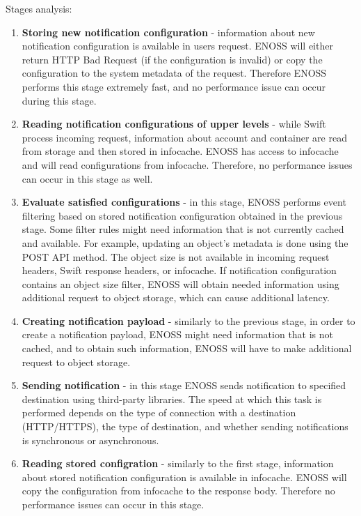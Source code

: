     Stages analysis:

    \begin{enumerate}
        \item \textbf{Storing new notification configuration} - information about new notification configuration is available in users request. ENOSS will either return HTTP Bad Request (if the configuration is invalid) or copy the configuration to the system metadata of the request. Therefore ENOSS performs this stage extremely fast, and no performance issue can occur during this stage.
        \item \textbf{Reading notification configurations of upper levels} - while Swift process incoming request, information about account and container are read from storage and then stored in infocache. ENOSS has access to infocache and will read configurations from infocache. Therefore, no performance issues can occur in this stage as well.
        \item \textbf{Evaluate satisfied configurations} - in this stage, ENOSS performs event filtering based on stored notification configuration obtained in the previous stage. Some filter rules might need information that is not currently cached and available. For example, updating an object's metadata is done using the POST API method. The object size is not available in incoming request headers, Swift response headers, or infocache. If notification configuration contains an object size filter, ENOSS will obtain needed information using additional request to object storage, which can cause additional latency.
        \item \textbf{Creating notification payload} - similarly to the previous stage, in order to create a notification payload, ENOSS might need information that is not cached, and to obtain such information, ENOSS will have to make additional request to object storage.
        \item \textbf{Sending notification} - in this stage ENOSS sends notification to specified destination using third-party libraries. The speed at which this task is performed depends on the type of connection with a destination (HTTP/HTTPS), the type of destination, and whether sending notifications is synchronous or asynchronous.
        \item \textbf{Reading stored configration} - similarly to the first stage, information about stored notification configuration is available in infocache. ENOSS will copy the configuration from infocache to the response body. Therefore no performance issues can occur in this stage.
    \end{enumerate}

